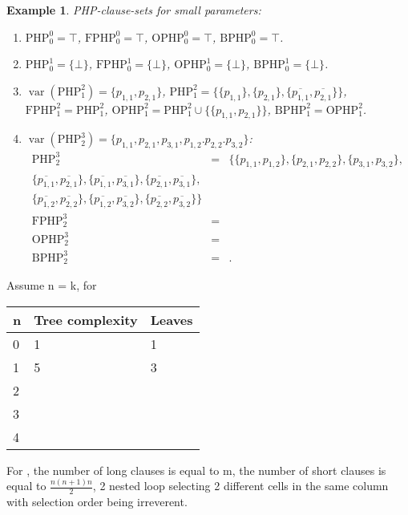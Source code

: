 \documentclass{report}
\newtheorem{examp}[defi]{Example}
\newcommand{\set}[1]{\{ #1 \}}
\newcommand{\ol}{\overline}
\DeclareMathOperator{\var}{var}
\newcommand{\php}{\mathrm{PHP}}
\newcommand{\fphp}{\mathrm{FPHP}} %
\newcommand{\ophp}{\mathrm{OPHP}} %
\newcommand{\ofphp}{\mathrm{BPHP}} %
\begin{document}
\begin{examp}\label{exp:PHPdef}
  PHP-clause-sets for small parameters:
  \begin{enumerate}
  \item $\php^0_0 = \top$, $\fphp^0_0 = \top$, $\ophp^0_0 = \top$, $\ofphp^0_0 = \top$.
  \item $\php^1_0 = \set{\bot}$, $\fphp^1_0 = \set{\bot}$, $\ophp^1_0 = \set{\bot}$, $\ofphp^1_0 = \set{\bot}$.
  \item $\var(\php^2_1) = \set{p_{1,1},p_{2,1}}$, $\php^2_1 = \set{\set{p_{1,1}}, \set{p_{2,1}}, \set{\ol{p_{1,1}},\ol{p_{2,1}}}}$, $\fphp^2_1 = \php^2_1$, $\ophp^2_1 = \php^2_1 \cup \set{\set{p_{1,1},p_{2,1}}}$, $\ofphp^2_1 = \ophp^2_1$.
  \item $\var(\php^3_2) = \set{p_{1,1},p_{2,1}, p_{3,1},p_{1,2}.p_{2,2}.p_{3,2}}$:
    \begin{eqnarray*}
      \php^3_2 & = & \set{\set{p_{1,1},p_{1,2}},\set{p_{2,1},p_{2,2}},\set{p_{3,1},p_{3,2}},
      \\
      \set{\ol{p_{1,1}},\ol{p_{2,1}}},\set{\ol{p_{1,1}},\ol{p_{3,1}}},\set{\ol{p_{2,1}},\ol{p_{3,1}}},
      \\
      \set{\ol{p_{1,2}},\ol{p_{2,2}}},\set{\ol{p_{1,2}},\ol{p_{3,2}}},\set{\ol{p_{2,2}},\ol{p_{3,2}}} }\\
      \fphp^3_2 & = &\\
      \ophp^3_2 & = &\\
      \ofphp^3_2 & = &.
    \end{eqnarray*}
  \end{enumerate}
\end{examp}

Assume n = k, for \bmm{\php^m_k}

\begin{table}[h]
\begin{tabular}{|l|l|l|}
\hline
n & Tree complexity & Leaves \\ \hline
0 &        1        &   1    \\ \hline
1 &        5        &   3    \\ \hline
2 &                 &        \\ \hline
3 &                 &        \\ \hline
4 &                 &        \\ \hline
\end{tabular}
\end{table}

For \bmm{\php^m_k}, the number of long clauses is equal to m, the number of short clauses is equal to $\frac {n(n+1)n}{2}$, 2 nested loop selecting 2 different cells in the same column with selection order being irreverent. 
\end{document}
